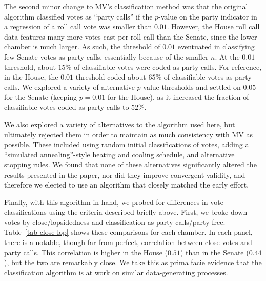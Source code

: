 \documentclass[12pt]{article}
\begin{document}
The second minor change to MV's classification method was that the original algorithm classified votes as ``party calls'' if the $p$-value on the party indicator in a regression of a roll call vote was smaller than $0.01$.  However, the House roll call data features many more votes cast per roll call than the Senate, since the lower chamber is much larger.  As such, the threshold of $0.01$ eventuated in classifying few
Senate votes as party calls, essentially because of the smaller $n$.
At the $0.01$ threshold, about $15\%$ of classifiable votes were coded as party calls.
For reference, in the House, the $0.01$ threshold coded about $65\%$ of classifiable votes as party calls.
We explored a variety of alternative $p$-value thresholds and settled on $0.05$ for the Senate (keeping $p = 0.01$ for the House), as it
increased the fraction of classifiable votes coded as party calls to $52\%$.

We also explored a variety of alternatives to the algorithm used here, but ultimately rejected them in order to maintain as much consistency with MV as possible.  These included using random initial classifications of votes, adding a ``simulated annealing''-style heating and cooling schedule, and alternative stopping rules.  We found that none of these alternatives significantly altered the results presented in the paper, nor did they improve convergent validity, and therefore we elected to use an algorithm that closely matched the early effort.

Finally, with this algorithm in hand, we probed for differences in vote classifications using the criteria described briefly above.  First, we broke down votes by close/lopsidedness and classification as party calls/party free.  Table~\ref{tab-close-lop} shows these comparisons for each chamber. In each panel, there is a notable, though far from perfect, correlation between close votes and party calls.  This correlation is higher in the House ($0.51$) than in the Senate ($0.44$), but the two are remarkably close.  We take this as prima facie evidence that the classification algorithm is at work on similar data-generating processes.
\end{document}
